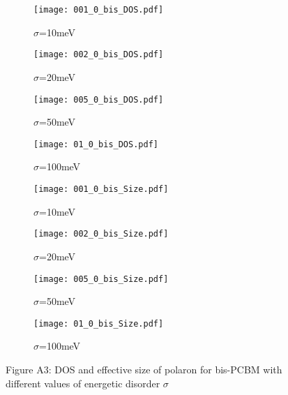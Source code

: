\documentclass[a4paper,12pt]{article}
\begin{document}
\begin{figure}[H]
\centering
\begin{subfigure}[b]{0.24\textwidth}
\texttt{[image: 001\_0\_bis\_DOS.pdf]}
\caption{$\sigma$=10meV}
\end{subfigure}
\begin{subfigure}[b]{0.24\textwidth}
\texttt{[image: 002\_0\_bis\_DOS.pdf]}
\caption{$\sigma$=20meV}
\end{subfigure}
\begin{subfigure}[b]{0.24\textwidth}
\texttt{[image: 005\_0\_bis\_DOS.pdf]}
\caption{$\sigma$=50meV}
\end{subfigure}
\begin{subfigure}[b]{0.24\textwidth}
\texttt{[image: 01\_0\_bis\_DOS.pdf]}
\caption{$\sigma$=100meV}
\end{subfigure}
\begin{subfigure}[b]{0.24\textwidth}
\texttt{[image: 001\_0\_bis\_Size.pdf]}
\caption{$\sigma$=10meV}
\end{subfigure}
\begin{subfigure}[b]{0.24\textwidth}
\texttt{[image: 002\_0\_bis\_Size.pdf]}
\caption{$\sigma$=20meV}
\end{subfigure}
\begin{subfigure}[b]{0.24\textwidth}
\texttt{[image: 005\_0\_bis\_Size.pdf]}
\caption{$\sigma$=50meV}
\end{subfigure}
\begin{subfigure}[b]{0.24\textwidth}
\texttt{[image: 01\_0\_bis\_Size.pdf]}
\caption{$\sigma$=100meV}
\end{subfigure}
\caption*{Figure A3: DOS and effective size of polaron for bis-PCBM with different values of energetic disorder $\sigma$}
\label{fig:disb}
\end{figure}
\end{document}

